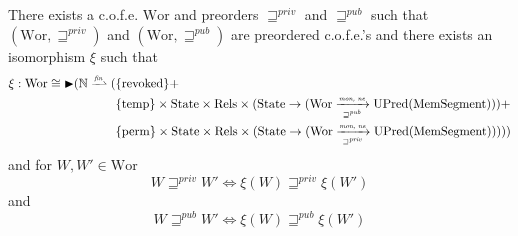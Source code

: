\documentclass[a4paper]{article}
\newcommand{\finparfun}{\xrightharpoonup{\textit{\tiny{fin}}}}
\newcommand{\monnefun}{\xrightarrow{\textit{\tiny{mon, ne}}}}
\newcommand{\fun}{\rightarrow}
\newcommand{\blater}{\mathop{\blacktriangleright}}
\newcommand{\cofe}{c.o.f.e.}
\newcommand{\cofes}{\cofe{}'s}
\newcommand{\var}[1]{\mathit{#1}}
\newcommand{\future}{\mathbin{\sqsupseteq}}
\newcommand{\pub}{\var{pub}}
\newcommand{\priv}{\var{priv}}
\newcommand{\futurewk}{\mathbin{\sqsupseteq}^{\var{pub}}}
\newcommand{\futurestr}{\mathbin{\sqsupseteq}^{\var{priv}}}
\newcommand{\monwknefun}{\xrightarrow[\text{\tiny{$\futurewk$}}]{\textit{\tiny{mon, ne}}}}
\newcommand{\monstrnefun}{\xrightarrow[\text{\tiny{$\futurestr$}}]{\textit{\tiny{mon, ne}}}}
\newcommand{\plaindom}[1]{\mathrm{#1}}
\newcommand{\HeapSegments}{\plaindom{MemSegment}}
\newcommand{\nats}{\mathbb{N}}
\newcommand{\Rels}{\plaindom{Rels}}
\newcommand{\States}{\plaindom{State}}
\newcommand{\Wor}{\plaindom{Wor}}
\newcommand{\Worwk}{\Wor_{\futurewk}}
\newcommand{\Worstr}{\Wor_{\futurestr}}
\newcommand{\UPred}[1]{\plaindom{UPred}(#1)}
\newcommand{\plainview}[1]{\mathrm{#1}}
\newcommand{\perma}{\plainview{perm}}
\newcommand{\temp}{\plainview{temp}}
\newcommand{\revoked}{\plainview{revoked}}
\begin{document}
\begin{comment}
\begin{lemma}
There exists $\Worstr$ and $\Worwk$ are preordered \cofes{} and $\xi_\pub$ and $\xi_\priv$ are isomorphisms such that
\begin{align*}
  \xi_\pub :   \Worwk \cong \blater (\nats \finparfun (   & \{\revoked\} + \\
                                                                & \{\temp\} \times \States \times \Rels \times (\States \fun (\Worwk \monnefun \UPred{\HeapSegments})) + \\
                                                                & \{\perma\} \times \States \times \Rels \times (\States \fun (\Worstr \monnefun \UPred{\HeapSegments})),\future_\priv)) \\ \\
  \xi_\priv :   \Worstr \cong \blater (\nats \finparfun ( & \{\revoked\} \times \States \times \Rels \times (\States \fun (\Wor \monwknefun \UPred{\HeapSegments})) + \\
                                                                & \{\temp\} \times \States \times \Rels \times (\States \fun (\Worwk \monnefun \UPred{\HeapSegments})) + \\
                                                                & \{\perma\} \times \States \times \Rels \times (\States \fun (\Worstr \monnefun \UPred{\HeapSegments})),\future_\priv))
\end{align*}
\end{lemma}
\end{comment}

\begin{theorem}
  There exists a \cofe{} $\Wor$ and preorders $\futurestr$ and $\futurewk$ such that $(\Wor,\futurestr)$ and $(\Wor,\futurewk)$ are preordered \cofes{} and there exists an isomorphism $\xi$ such that
  \begin{align*}
    \xi : \Wor \cong \blater (\nats \finparfun ( & \{\revoked\}  + \\
                                          & \{\temp\} \times \States \times \Rels \times (\States \fun (\Wor \monwknefun \UPred{\HeapSegments})) + \\
                                          & \{\perma\} \times \States \times \Rels \times (\States \fun (\Wor \monstrnefun \UPred{\HeapSegments}))))
  \end{align*}
 and for $W, W' \in \Wor$
 \[
   W \futurestr W' \Leftrightarrow \xi(W) \futurestr \xi(W')
 \]
and
 \[
   W \futurewk W' \Leftrightarrow \xi(W) \futurewk \xi(W')
 \]
\end{theorem}
\end{document}
